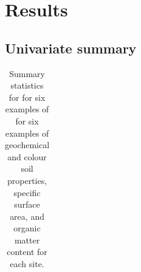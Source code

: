 \documentclass[
  number]{elsarticle}
\begin{document}
\section{Results}\label{results}

\subsection{Univariate summary}\label{univariate-summary}

\begin{longtable}[]{@{}
  >{\centering\arraybackslash}p{}
  >{\centering\arraybackslash}p{}
  >{\centering\arraybackslash}p{}
  >{\centering\arraybackslash}p{}
  >{\centering\arraybackslash}p{}
  >{\centering\arraybackslash}p{}
  >{\centering\arraybackslash}p{}@{}}

\caption{\label{tbl-univariate-summary}Summary statistics for for six
examples of for six examples of geochemical and colour soil properties,
specific surface area, and organic matter content for each site.}

\tabularnewline


\end{longtable}
\end{document}
